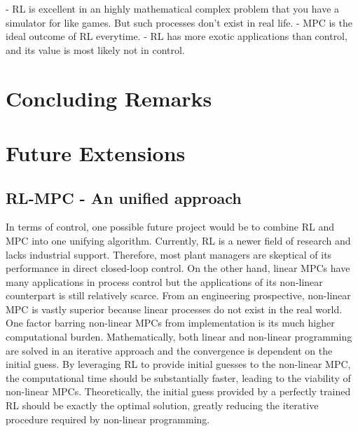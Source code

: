 - RL is excellent in an highly mathematical complex problem that you have a simulator for like games.  But such processes don't exist in real life.
- MPC is the ideal outcome of RL everytime.
- RL has more exotic applications than control, and its value is most likely not in control.

\section{Concluding Remarks}

\section{Future Extensions}
\subsection{RL-MPC - An unified approach}
In terms of control, one possible future project would be to combine RL and MPC into one unifying algorithm.  Currently, RL is a newer field of research and lacks industrial support. Therefore, most plant managers are skeptical of its performance in direct closed-loop control. On the other hand, linear MPCs have many applications in process control but the applications of its non-linear counterpart is still relatively scarce. From an engineering prospective, non-linear MPC is vastly superior because linear processes do not exist in the real world. One factor barring non-linear MPCs from implementation is its much higher computational burden. Mathematically, both linear and non-linear programming are solved in an iterative approach and the convergence is dependent on the initial guess.  By leveraging RL to provide initial guesses to the non-linear MPC, the computational time should be substantially faster, leading to the viability of non-linear MPCs. Theoretically, the initial guess provided by a perfectly trained RL should be exactly the optimal solution, greatly reducing the iterative procedure required by non-linear programming.  

